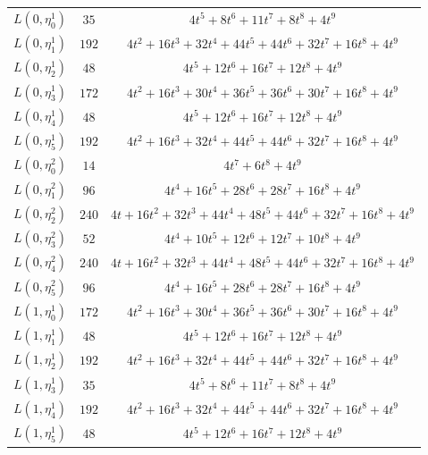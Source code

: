 \begin{center}
\begin{tabular}{c|c|c}
$L(0,\eta^{1}_{0})$ & $35$ & $4t^{5} + 8t^{6} + 11t^{7} + 8t^{8} + 4t^{9}$ \\
$L(0,\eta^{1}_{1})$ & $192$ & $4t^{2} + 16t^{3} + 32t^{4} + 44t^{5} + 44t^{6} + 32t^{7} + 16t^{8} + 4t^{9}$ \\
$L(0,\eta^{1}_{2})$ & $48$ & $4t^{5} + 12t^{6} + 16t^{7} + 12t^{8} + 4t^{9}$ \\
$L(0,\eta^{1}_{3})$ & $172$ & $4t^{2} + 16t^{3} + 30t^{4} + 36t^{5} + 36t^{6} + 30t^{7} + 16t^{8} + 4t^{9}$ \\
$L(0,\eta^{1}_{4})$ & $48$ & $4t^{5} + 12t^{6} + 16t^{7} + 12t^{8} + 4t^{9}$ \\
$L(0,\eta^{1}_{5})$ & $192$ & $4t^{2} + 16t^{3} + 32t^{4} + 44t^{5} + 44t^{6} + 32t^{7} + 16t^{8} + 4t^{9}$ \\
$L(0,\eta^{2}_{0})$ & $14$ & $4t^{7} + 6t^{8} + 4t^{9}$ \\
$L(0,\eta^{2}_{1})$ & $96$ & $4t^{4} + 16t^{5} + 28t^{6} + 28t^{7} + 16t^{8} + 4t^{9}$ \\
$L(0,\eta^{2}_{2})$ & $240$ & $4t + 16t^{2} + 32t^{3} + 44t^{4} + 48t^{5} + 44t^{6} + 32t^{7} + 16t^{8} + 4t^{9}$ \\
$L(0,\eta^{2}_{3})$ & $52$ & $4t^{4} + 10t^{5} + 12t^{6} + 12t^{7} + 10t^{8} + 4t^{9}$ \\
$L(0,\eta^{2}_{4})$ & $240$ & $4t + 16t^{2} + 32t^{3} + 44t^{4} + 48t^{5} + 44t^{6} + 32t^{7} + 16t^{8} + 4t^{9}$ \\
$L(0,\eta^{2}_{5})$ & $96$ & $4t^{4} + 16t^{5} + 28t^{6} + 28t^{7} + 16t^{8} + 4t^{9}$ \\
$L(1,\eta^{1}_{0})$ & $172$ & $4t^{2} + 16t^{3} + 30t^{4} + 36t^{5} + 36t^{6} + 30t^{7} + 16t^{8} + 4t^{9}$ \\
$L(1,\eta^{1}_{1})$ & $48$ & $4t^{5} + 12t^{6} + 16t^{7} + 12t^{8} + 4t^{9}$ \\
$L(1,\eta^{1}_{2})$ & $192$ & $4t^{2} + 16t^{3} + 32t^{4} + 44t^{5} + 44t^{6} + 32t^{7} + 16t^{8} + 4t^{9}$ \\
$L(1,\eta^{1}_{3})$ & $35$ & $4t^{5} + 8t^{6} + 11t^{7} + 8t^{8} + 4t^{9}$ \\
$L(1,\eta^{1}_{4})$ & $192$ & $4t^{2} + 16t^{3} + 32t^{4} + 44t^{5} + 44t^{6} + 32t^{7} + 16t^{8} + 4t^{9}$ \\
$L(1,\eta^{1}_{5})$ & $48$ & $4t^{5} + 12t^{6} + 16t^{7} + 12t^{8} + 4t^{9}$ \\
\hline
\end{tabular}
\end{center}
